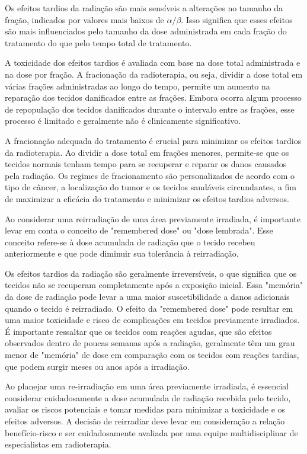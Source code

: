 \documentclass[11pt,a4paper]{article}
\begin{document}
	Os efeitos tardios da radiação são mais sensíveis a alterações no tamanho da fração, indicados por valores mais baixos de $\alpha/\beta$. Isso significa que esses efeitos são mais influenciados pelo tamanho da dose administrada em cada fração do tratamento do que pelo tempo total de tratamento.

	A toxicidade dos efeitos tardios é avaliada com base na dose total administrada e na dose por fração. A fracionação da radioterapia, ou seja, dividir a dose total em várias frações administradas ao longo do tempo, permite um aumento na reparação dos tecidos danificados entre as frações. Embora ocorra algum processo de repopulação dos tecidos danificados durante o intervalo entre as frações, esse processo é limitado e geralmente não é clinicamente significativo.

	A fracionação adequada do tratamento é crucial para minimizar os efeitos tardios da radioterapia. Ao dividir a dose total em frações menores, permite-se que os tecidos normais tenham tempo para se recuperar e reparar os danos causados pela radiação. Os regimes de fracionamento são personalizados de acordo com o tipo de câncer, a localização do tumor e os tecidos saudáveis circundantes, a fim de maximizar a eficácia do tratamento e minimizar os efeitos tardios adversos.

	Ao considerar uma reirradiação de uma área previamente irradiada, é importante levar em conta o conceito de "remembered dose" ou "dose lembrada". Esse conceito refere-se à dose acumulada de radiação que o tecido recebeu anteriormente e que pode diminuir sua tolerância à reirradiação.

	Os efeitos tardios da radiação são geralmente irreversíveis, o que significa que os tecidos não se recuperam completamente após a exposição inicial. Essa "memória" da dose de radiação pode levar a uma maior suscetibilidade a danos adicionais quando o tecido é reirradiado. O efeito da "remembered dose" pode resultar em uma maior toxicidade e risco de complicações em tecidos previamente irradiados. É importante ressaltar que os tecidos com reações agudas, que são efeitos observados dentro de poucas semanas após a radiação, geralmente têm um grau menor de "memória" de dose em comparação com os tecidos com reações tardias, que podem surgir meses ou anos após a irradiação.

	Ao planejar uma re-irradiação em uma área previamente irradiada, é essencial considerar cuidadosamente a dose acumulada de radiação recebida pelo tecido, avaliar os riscos potenciais e tomar medidas para minimizar a toxicidade e os efeitos adversos. A decisão de reirradiar deve levar em consideração a relação benefício-risco e ser cuidadosamente avaliada por uma equipe multidisciplinar de especialistas em radioterapia.
\end{document}
